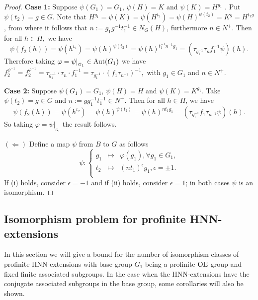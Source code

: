 \documentclass[a4paper,12pt]{article}
\def\OE{{\rm OE}}
\def\aut {{\rm Aut}}
\begin{document}
{\begin{proof}
\textbf{Case 1:} Suppose  $\psi(G_1) = G_1$, $\psi(H)=K$ and $\psi(K)=H^{g_1}$ . 
Put $\psi(t_2) = g \in G$. Note that $ H^{g_1}=\psi(K) =\psi(H^{t_2})=\psi(H)^{\psi(t_2)}=K^g=H^{t_1g}$, from where it follows that $n:=g_1 g^{-1} t_{1}^{-1} \in N_G(H)$, furthermore $n\in N^{+}$. %
Then for all $h \in H,$ we have$$\psi(f_2(h))=\psi(h^{t_2})=\psi(h)^{\psi(t_2)}=\psi(h)^{t_{1}^{- 1}n^{-1}g_1}=(\tau_{g_1^{-1}}\tau_{n} f_1^{- 1}  \psi)(h).$$ Therefore taking $\varphi = \psi|_{_{G_1}} \in \aut(G_1)$ we have  $f_2^{\psi^{-1}} = f_2^{\varphi^{-1}} = \tau_{g_1^{-1}} \cdot \tau_{n} \cdot f_1^{-1}= \tau_{g_1^{-1}} \cdot   (f_1\tau_{n^{-1}})^{-1},$ with $g_1 \in G_1$ and $n\in N^{+}$. 

\textbf{Case 2:} Suppose $\psi(G_1) = G_1$, $\psi(H)=H$ and $\psi(K)=K^{g_1}$. %
Take $\psi(t_2)=g\in G$ and $n:=gg_1^{-1}t_1^{-1} \in N^{+}$. 
Then for all $h\in H$, we have $$\psi(f_2(h))=\psi(h^{t_2})=\psi(h)^{\psi(t_2)}=\psi(h)^{ n t_1g_1}=(\tau_{g_1^{-1}} f_1 \tau_{n^{-1}} \psi)(h).$$ 
So  taking $\varphi=\psi|_{_{G_1}}$ the result follows. 

\bigskip
$(\Longleftarrow)$ Define a map $\psi$  from $B$ to $G$ as follows $$\psi: \left\{
\begin{array}{ccl}
g_1 & \longmapsto  & \varphi(g_1), \forall  g_1 \in  G_1,\\
t_2 & \longmapsto  & (nt_1)^{\epsilon}g_1, \epsilon=\pm 1. \\
\end{array}
\right.$$
If (i) holds, consider $\epsilon=-1$ and if  (ii) holds, consider $\epsilon=1$;  in both cases $\psi$ is an isomorphism.

\end{proof} 


\subsection{Isomorphism problem for profinite HNN-extensions} \label{iso profinite HNN}


In this section we will give a bound for the number of isomorphism classes of profinite HNN-extensions with base group $G_1$ being a profinite $\OE$-group and fixed finite associated  subgroups. In the  case when the HNN-extensions have the conjugate associated subgroups  in the base group, some corollaries will also be shown.

}
\end{document}
